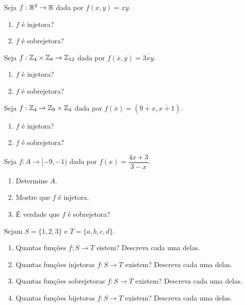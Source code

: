\documentclass[12pt]{exam}
\begin{document}
    \questao{} Seja $f: \mathbb{R}^2 \to \mathbb{R}$ dada por $f(x,y) = xy$.
    \begin{enumerate}[label={\alph*})]
        \item $f$ {\'e} injetora?

        \item $f$ {\'e} sobrejetora?
    \end{enumerate}

    \vspace{.3cm}

    \questao{} Seja $f: \mathbb{Z}_4 \times \mathbb{Z}_8 \to \mathbb{Z}_{12}$ dada por $f(\overline{x},\overline{y}) = \overline{3xy}$.
    \begin{enumerate}[label={\alph*})]
        \item $f$ {\'e} injetora?

        \item $f$ {\'e} sobrejetora?
    \end{enumerate}

    \vspace{.3cm}

    \questao{} Seja $f: \mathbb{Z}_4 \to \mathbb{Z}_9 \times \mathbb{Z}_4$ dada por $f(\overline{x}) = (\overline{9 + x},\overline{x+1})$.
    \begin{enumerate}[label={\alph*})]
        \item $f$ {\'e} injetora?

        \item $f$ {\'e} sobrejetora?
    \end{enumerate}

    \vspace{.3cm}

    \questao{} Seja $f : A \to [-9,-1)$ dada por $f(x) = \dfrac{4x + 3}{3 - x}$.
    \begin{enumerate}[label={\alph*})]
        \item Determine $A$.

        \item Mostre que $f$ \'e injetora.

        \item \'E verdade que $f$ \'e sobrejetora?
    \end{enumerate}

    \vspace{.3cm}

    \questao{} Sejam $S = \{1, 2, 3\}$ e $T = \{a, b, c, d\}$.
    \begin{enumerate}[label={\alph*})]
        \item Quantas funções $f : S \to T$ eistem? Descreva cada uma delas.

        \item Quantas funções injetoras $f : S \to T$ existem? Descreva cada uma delas.

        \item Quantas funções sobrejetoras $f : S \to T$ existem? Descreva cada uma delas.

        \item Quantas funções bijetoras $f : S \to T$ existem? Descreva cada uma delas.
    \end{enumerate}
\end{document}
